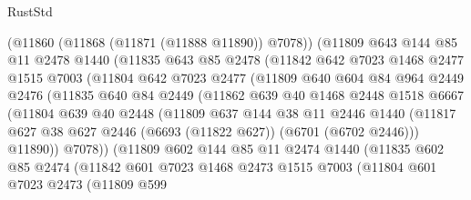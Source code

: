 \begin{lexlean}{RustStd}
\begin{coremodule}
            (@11860 (@11868 (@11871 (@11888 @11890)) @7078))
            (@11809
              @643
              @144
              @85
              @11
              @2478
              @1440
              (@11835
                @643
                @85
                @2478
                (@11842
                  @642
                  @7023
                  @1468
                  @2477
                  @1515
                  @7003
                  (@11804
                    @642
                    @7023
                    @2477
                    (@11809
                      @640
                      @604
                      @84
                      @964
                      @2449
                      @2476
                      (@11835
                        @640
                        @84
                        @2449
                        (@11862
                          @639
                          @40
                          @1468
                          @2448
                          @1518
                          @6667
                          (@11804
                            @639
                            @40
                            @2448
                            (@11809
                              @637
                              @144
                              @38
                              @11
                              @2446
                              @1440
                              (@11817
                                @627
                                @38
                                @627
                                @2446
                                (@6693 (@11822 @627))
                                (@6701 (@6702 @2446)))
                              @11890))
                          @7078))
                      (@11809
                        @602
                        @144
                        @85
                        @11
                        @2474
                        @1440
                        (@11835
                          @602
                          @85
                          @2474
                          (@11842
                            @601
                            @7023
                            @1468
                            @2473
                            @1515
                            @7003
                            (@11804
                              @601
                              @7023
                              @2473
                              (@11809
                                @599

\end{coremodule}
\end{lexlean}
